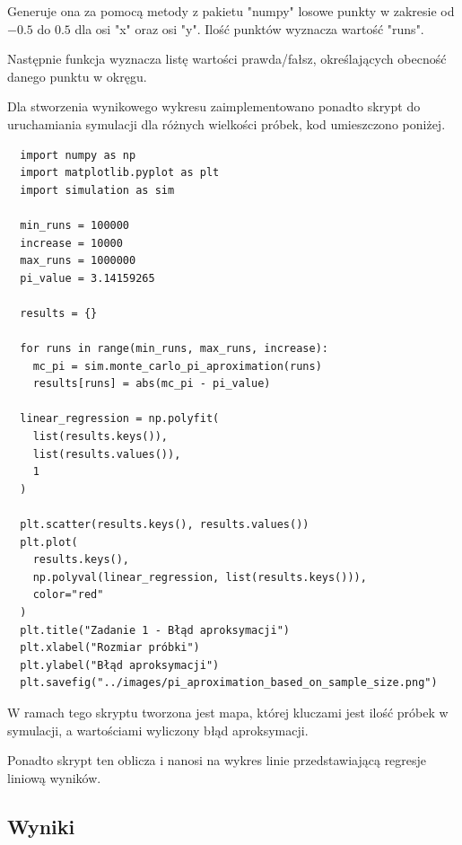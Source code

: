 \documentclass[12pt,oneside,a4paper]{book} %
\theoremstyle{break}
\begin{document}
Generuje ona za pomocą metody z pakietu "numpy" losowe punkty w zakresie od $-0.5$ do $0.5$ dla osi "x" oraz osi "y". Ilość punktów wyznacza wartość "runs".

Następnie funkcja wyznacza listę wartości prawda/fałsz, określających obecność danego punktu w okręgu.

Dla stworzenia wynikowego wykresu zaimplementowano ponadto skrypt do uruchamiania symulacji dla różnych wielkości próbek, kod umieszczono poniżej.

\begin{verbatim}
  import numpy as np
  import matplotlib.pyplot as plt
  import simulation as sim

  min_runs = 100000
  increase = 10000
  max_runs = 1000000
  pi_value = 3.14159265

  results = {}

  for runs in range(min_runs, max_runs, increase):
    mc_pi = sim.monte_carlo_pi_aproximation(runs)
    results[runs] = abs(mc_pi - pi_value)

  linear_regression = np.polyfit(
    list(results.keys()), 
    list(results.values()), 
    1
  )

  plt.scatter(results.keys(), results.values())
  plt.plot(
    results.keys(), 
    np.polyval(linear_regression, list(results.keys())), 
    color="red"
  )
  plt.title("Zadanie 1 - Błąd aproksymacji")
  plt.xlabel("Rozmiar próbki")
  plt.ylabel("Błąd aproksymacji")
  plt.savefig("../images/pi_aproximation_based_on_sample_size.png")
\end{verbatim}

W ramach tego skryptu tworzona jest mapa, której kluczami jest ilość próbek w symulacji, a wartościami wyliczony błąd aproksymacji.

Ponadto skrypt ten oblicza i nanosi na wykres linie przedstawiającą regresje liniową wyników.

\newpage
\subsection*{Wyniki}
\end{document}

